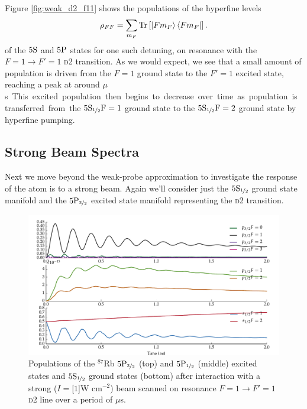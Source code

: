     Figure \ref{fig:weak_d2_f11} shows the populations of the hyperfine levels
    \begin{equation}
      \rho_{FF} = \sum_{m_F} \operatorname{Tr} \left[ \Ket{F m_F} \Bra{F m_F} \right].
    \end{equation}
    of the $5\rm{S}$ and $5\rm{P}$ states for one such detuning, on
    resonance with the $F = 1 \rightarrow F' = 1$ \textsc{d2} transition. As we
    would expect, we see that a small amount of population is driven from the $F
    = 1$ ground state to the $F' = 1$ excited state, reaching a peak at around
    \unit[3]{$\mu$s}. This excited population then begins to decrease over time
    as population is transferred from the $5\rm{S}_{\nicefrac{1}{2}} F = 1$
    ground state  to the $5\rm{S}_{\nicefrac{1}{2}} F = 2$ ground state by
    hyperfine pumping.

  \subsection{Strong Beam Spectra}

    Next we move beyond the weak-probe approximation to investigate the response
    of the atom is to a strong beam. Again we'll consider just the
    $5\rm{S}_{\nicefrac{1}{2}}$ ground state manifold and the
    $5\rm{P}_{\nicefrac{3}{2}}$ excited state manifold representing the
    \textsc{d2} transition.

    \begin{figure}%
    \includegraphics[width=\linewidth]
        {figs/05_twophoton/rb87_5spd_hf_solve_b3_fig1.pdf}
    \caption{
    Populations of the $^{87}$Rb $5\rm{P}_{\nicefrac{3}{2}}$ (top) and
    $5\rm{P}_{\nicefrac{1}{2}}$ (middle) excited states and
    $5\rm{S}_{\nicefrac{1}{2}}$ ground states (bottom)  after interaction with
    a strong ($I = $\unit[$1$]{W cm$^{-2}$}) beam scanned on resonance $F = 1
    \rightarrow F' = 1$ \textsc{d2} line over a period of \unit[2]{$\mu$s}.
    }
    \label{fig:strong_d2_f11} 
    \end{figure}

